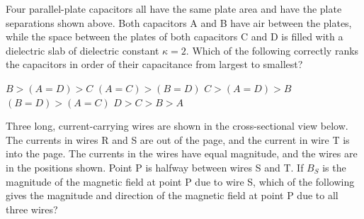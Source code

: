 \documentclass[12pt]{../../oss-apphys-exam}
\begin{document}
\begin{questions}
  \question Four parallel-plate capacitors all have the same plate area and
  have the plate separations shown above. Both capacitors A and B have air
  between the plates, while the space between the plates of both capacitors C
  and D is filled with a dielectric slab of dielectric constant $\kappa=2$.
  Which of the following correctly ranks the capacitors in order of their
  capacitance from largest to smallest?
  \begin{choices}
    \choice $B>(A=D)>C$
    \choice $(A=C)>(B=D)$
    \choice $C>(A=D)>B$
    \choice $(B=D)>(A=C)$
    \choice $D>C>B>A$
  \end{choices}
  \newpage
  
  \question Three long, current-carrying wires are shown in the cross-sectional
  view below. The currents in wires R and S are out of the page, and the
  current in wire T is into the page. The currents in the wires have equal
  magnitude, and the wires are in the positions shown. Point P is halfway
  between wires S and T. If $B_S$ is the magnitude of the magnetic field at
  point P due to wire S, which of the following gives the magnitude and
  direction of the magnetic field at point P due to all three wires?
\end{questions}
\end{document}
